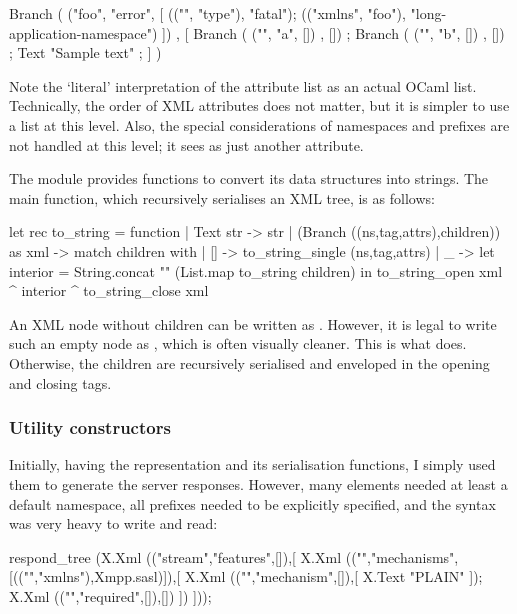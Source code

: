 \begin{ocaml}
Branch ( ("foo", "error", [
    (("", "type"), "fatal");
    (("xmlns", "foo"), "long-application-namespace")
  ]) , [
    Branch ( ("", "a", []) , []) ;
    Branch ( ("", "b", []) , []) ;
    Text "Sample text" ;
] )
\end{ocaml}

Note the `literal' interpretation of the attribute list as an actual OCaml list. Technically, the order of XML attributes does not matter, but it is simpler to use a list at this level. Also, the special considerations of namespaces and prefixes are not handled at this level; it sees  as just another attribute.

The  module provides functions to convert its data structures into strings. The main  function, which recursively serialises an XML tree, is as follows:

\begin{ocaml}
let rec to_string = function
  | Text str -> str
  | (Branch ((ns,tag,attrs),children)) as xml ->
    match children with
    | [] -> to_string_single (ns,tag,attrs)
    | _  -> let interior = String.concat "" (List.map to_string children) in
            to_string_open xml ^ interior ^ to_string_close xml
\end{ocaml}

An XML node without children can be written as . However, it is legal to write such an empty node as , which is often visually cleaner. This is what  does. Otherwise, the children are recursively serialised and enveloped in the opening and closing tags.

\subsubsection{Utility constructors}
Initially, having the  representation and its serialisation functions, I simply used them to generate the server responses. However, many elements needed at least a default namespace, all prefixes needed to be explicitly specified, and the syntax was very heavy to write and read:

\begin{ocaml}
respond_tree
  (X.Xml (("stream","features",[]),[
    X.Xml (("","mechanisms",[(("","xmlns"),Xmpp.sasl)]),[
        X.Xml (("","mechanism",[]),[ X.Text "PLAIN" ]);
        X.Xml (("","required",[]),[])
      ])
  ]));
\end{ocaml}

